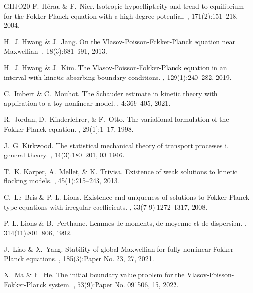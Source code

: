 \documentclass[10pt, reqno]{amsart}
\theoremstyle{plain}
\theoremstyle{definition}
\theoremstyle{remark}
\numberwithin{equation}{section}
\begin{document}
\begin{thebibliography}{GHJO20}
{\sc F.~H\'erau \& F.~Nier.}
\newblock Isotropic hypoellipticity and trend to equilibrium for the
  {F}okker-{P}lanck equation with a high-degree potential.
, 171(2):151--218, 2004.

{\sc H.~J. Hwang \& J.~Jang.}
\newblock On the {V}lasov-{P}oisson-{F}okker-{P}lanck equation near
  {M}axwellian.
, 18(3):681--691, 2013.

{\sc H.~J. Hwang \& J.~Kim.}
\newblock The {V}lasov-{P}oisson-{F}okker-{P}lanck equation in an interval with
  kinetic absorbing boundary conditions.
, 129(1):240--282, 2019.

{\sc C.~Imbert \& C.~Mouhot.}
\newblock The {S}chauder estimate in kinetic theory with application to a toy nonlinear model.
, 4:369--405, 2021.

{\sc R.~Jordan, D.~Kinderlehrer, \& F.~Otto.}
\newblock The variational formulation of the {F}okker-{P}lanck equation.
, 29(1):1--17, 1998.

{\sc J.~G. Kirkwood.}
\newblock The statistical mechanical theory of transport processes i. general theory.
, 14(3):180--201, 03 1946.

{\sc T.~K. Karper, A.~Mellet, \& K.~Trivisa.}
\newblock Existence of weak solutions to kinetic flocking models.
, 45(1):215--243, 2013.

{\sc C.~Le~Bris \& P.-L. Lions.}
\newblock Existence and uniqueness of solutions to {F}okker-{P}lanck type equations with irregular coefficients.
, 33(7-9):1272--1317, 2008.

{\sc P.-L. Lions \& B.~Perthame.}
\newblock Lemmes de moments, de moyenne et de dispersion.
, 314(11):801--806, 1992.


{\sc J.~Liao \& X.~Yang.}
\newblock Stability of global {M}axwellian for fully nonlinear {F}okker-{P}lanck equations.
, 185(3):Paper No. 23, 27, 2021.

{\sc X.~Ma \& F.~He.}
\newblock The initial boundary value problem for the
  {V}lasov-{P}oisson-{F}okker-{P}lanck system.
, 63(9):Paper No. 091506, 15, 2022.


\end{thebibliography}
\end{document}
